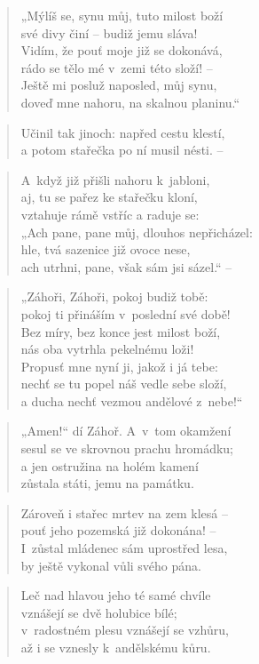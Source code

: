 \begin{verse}
„Mýlíš se, synu můj, tuto milost boží \\
své divy činí -- budiž jemu sláva! \\
Vidím, že pouť moje již se dokonává, \\
rádo se tělo mé v~zemi této složí! -- \\
Ještě mi posluž naposled, můj synu, \\
doveď mne nahoru, na skalnou planinu.“
\end{verse}

\begin{verse}
Učinil tak jinoch: napřed cestu klestí, \\
a potom stařečka po ní musil nésti. --
\end{verse}

\begin{verse}
A~když již přišli nahoru k~jabloni, \\
aj, tu se pařez ke stařečku kloní, \\
vztahuje rámě vstříc a raduje se: \\
„Ach pane, pane můj, dlouhos nepřicházel: \\
hle, tvá sazenice již ovoce nese, \\
ach utrhni, pane, však sám jsi sázel.“ --
\end{verse}

\begin{verse}
„Záhoři, Záhoři, pokoj budiž tobě: \\
pokoj ti přináším v~poslední své době! \\
Bez míry, bez konce jest milost boží, \\
nás oba vytrhla pekelnému loži! \\
Propusť mne nyní ji, jakož i já tebe: \\
nechť se tu popel náš vedle sebe složí, \\
a ducha nechť vezmou andělové z~nebe!“
\end{verse}

\begin{verse}
„Amen!“ dí Záhoř. A~v~tom okamžení \\
sesul se ve skrovnou prachu hromádku; \\
a jen ostružina na holém kamení \\
zůstala státi, jemu na památku.
\end{verse}

\begin{verse}
Zároveň i stařec mrtev na zem klesá -- \\
pouť jeho pozemská již dokonána! -- \\
I~zůstal mládenec sám uprostřed lesa, \\
by ještě vykonal vůli svého pána.
\end{verse}

\begin{verse}
Leč nad hlavou jeho té samé chvíle \\
vznášejí se dvě holubice bílé; \\
v~radostném plesu vznášejí se vzhůru, \\
až i se vznesly k~andělskému kůru.
\end{verse}